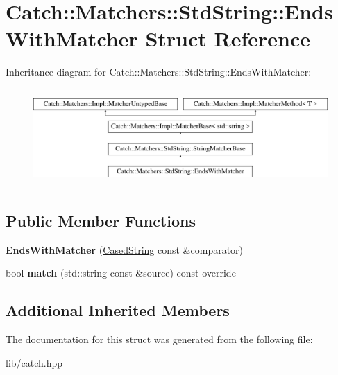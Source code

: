 \hypertarget{struct_catch_1_1_matchers_1_1_std_string_1_1_ends_with_matcher}{}\section{Catch\+:\+:Matchers\+:\+:Std\+String\+:\+:Ends\+With\+Matcher Struct Reference}
\label{struct_catch_1_1_matchers_1_1_std_string_1_1_ends_with_matcher}
Inheritance diagram for Catch\+:\+:Matchers\+:\+:Std\+String\+:\+:Ends\+With\+Matcher\+:\begin{figure}[H]
\begin{center}
\leavevmode
\includegraphics[height=3.758389cm]{struct_catch_1_1_matchers_1_1_std_string_1_1_ends_with_matcher}
\end{center}
\end{figure}
\subsection*{Public Member Functions}
\begin{DoxyCompactItemize}
\item 
\mbox{\label{struct_catch_1_1_matchers_1_1_std_string_1_1_ends_with_matcher_aa5ec700b4629562f74f362080accfd7b}} 
{\bfseries Ends\+With\+Matcher} (\mbox{\hyperlink{struct_catch_1_1_matchers_1_1_std_string_1_1_cased_string}{Cased\+String}} const \&comparator)
\item 
\mbox{\label{struct_catch_1_1_matchers_1_1_std_string_1_1_ends_with_matcher_aca2741fa57374a2a98d2a84ac3e13a6d}} 
bool {\bfseries match} (std\+::string const \&source) const override
\end{DoxyCompactItemize}
\subsection*{Additional Inherited Members}


The documentation for this struct was generated from the following file\+:\begin{DoxyCompactItemize}
\item 
lib/catch.\+hpp\end{DoxyCompactItemize}
